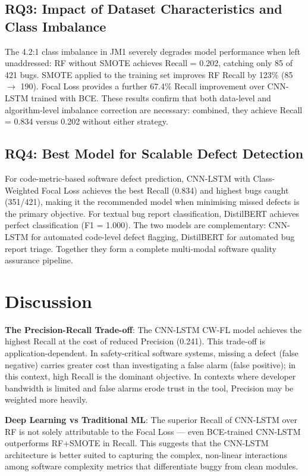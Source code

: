 \documentclass[12pt,a4paper,oneside]{report}
\begin{document}
\subsection*{RQ3: Impact of Dataset Characteristics and Class Imbalance}

The 4.2:1 class imbalance in JM1 severely degrades model performance when left unaddressed: RF without SMOTE achieves Recall = 0.202, catching only 85 of 421 bugs. SMOTE applied to the training set improves RF Recall by 123\% (85 $\rightarrow$ 190). Focal Loss provides a further 67.4\% Recall improvement over CNN-LSTM trained with BCE. These results confirm that both data-level and algorithm-level imbalance correction are necessary: combined, they achieve Recall = 0.834 versus 0.202 without either strategy.

\subsection*{RQ4: Best Model for Scalable Defect Detection}

For code-metric-based software defect prediction, CNN-LSTM with Class-Weighted Focal Loss achieves the best Recall (0.834) and highest bugs caught (351/421), making it the recommended model when minimising missed defects is the primary objective. For textual bug report classification, DistilBERT achieves perfect classification (F1 = 1.000). The two models are complementary: CNN-LSTM for automated code-level defect flagging, DistilBERT for automated bug report triage. Together they form a complete multi-modal software quality assurance pipeline.

\section{Discussion}

\textbf{The Precision-Recall Trade-off}: The CNN-LSTM CW-FL model achieves the highest Recall at the cost of reduced Precision (0.241). This trade-off is application-dependent. In safety-critical software systems, missing a defect (false negative) carries greater cost than investigating a false alarm (false positive); in this context, high Recall is the dominant objective. In contexts where developer bandwidth is limited and false alarms erode trust in the tool, Precision may be weighted more heavily.

\textbf{Deep Learning vs Traditional ML}: The superior Recall of CNN-LSTM over RF is not solely attributable to the Focal Loss --- even BCE-trained CNN-LSTM outperforms RF+SMOTE in Recall. This suggests that the CNN-LSTM architecture is better suited to capturing the complex, non-linear interactions among software complexity metrics that differentiate buggy from clean modules.
\end{document}
